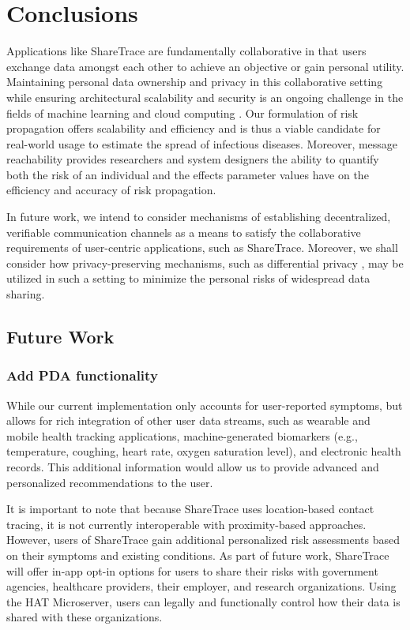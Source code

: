 \chapter{Conclusions}

\par Applications like ShareTrace are fundamentally collaborative in that users exchange data amongst each other to achieve an objective or gain personal utility. Maintaining personal data ownership and privacy in this collaborative setting while ensuring architectural scalability and security is an ongoing challenge in the fields of machine learning and cloud computing \cite{Cano2015, Hsieh2017, Jonas2017, Singhvi2017}. Our formulation of risk propagation offers scalability and efficiency and is thus a viable candidate for real-world usage to estimate the spread of infectious diseases. Moreover, message reachability provides researchers and system designers the ability to quantify both the risk of an individual and the effects parameter values have on the efficiency and accuracy of risk propagation.

In future work, we intend to consider mechanisms of establishing decentralized, verifiable communication channels \cite{Abramson2020} as a means to satisfy the collaborative requirements of user-centric applications, such as ShareTrace. Moreover, we shall consider how privacy-preserving mechanisms, such as differential privacy \cite{Dwork2014}, may be utilized in such a setting to minimize the personal risks of widespread data sharing.

\section{Future Work}

\subsection{Add PDA functionality}
\par While our current implementation only accounts for user-reported symptoms, but allows for rich integration of other user data streams, such as wearable and mobile health tracking applications, machine-generated biomarkers (e.g., temperature, coughing, heart rate, oxygen saturation level), and electronic health records. This additional information would allow us to provide advanced and personalized recommendations to the user.
\par It is important to note that because ShareTrace uses location-based contact tracing, it is not currently interoperable with proximity-based approaches. However, users of ShareTrace gain additional personalized risk assessments based on their symptoms and existing conditions. As part of future work, ShareTrace will offer in-app opt-in options for users to share their risks with government agencies, healthcare providers, their employer, and research organizations. Using the HAT Microserver, users can legally and functionally control how their data is shared with these organizations.

